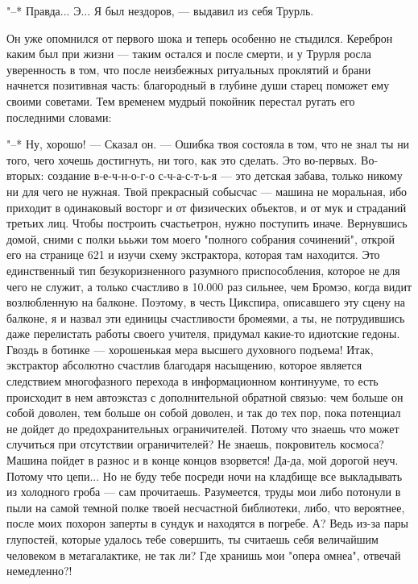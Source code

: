 "--* Правда... Э... Я был нездоров, --- выдавил из себя
Трурль.

Он уже опомнился от первого шока и теперь особенно не
стыдился. Кереброн каким был при жизни --- таким остался и
после смерти, и у Трурля росла уверенность в том, что после
неизбежных ритуальных проклятий и брани начнется позитивная
часть: благородный в глубине души старец поможет ему своими
советами. Тем временем мудрый покойник перестал ругать его
последними словами:

"--* Ну, хорошо! --- Сказал он. --- Ошибка твоя состояла в
том, что не знал ты ни того, чего хочешь достигнуть, ни
того, как это сделать. Это во-первых. Во-вторых: создание
в-е-ч-н-о-г-о с-ч-а-с-т-ь-я --- это детская забава, только
никому ни для чего не нужная. Твой прекрасный собысчас --- машина
не моральная, ибо приходит в одинаковый восторг и от
физических объектов, и от мук и страданий третьих лиц. Чтобы
построить счастьетрон, нужно поступить иначе. Вернувшись
домой, сними с полки ьььжи том моего "полного собрания
сочинений", открой его на странице 621 и изучи схему
экстрактора, которая там находится. Это единственный тип
безукоризненного разумного приспособления, которое не для
чего не служит, а только счастливо в 10.000 раз сильнее, чем
Бромэо, когда видит возлюбленную на балконе. Поэтому, в
честь Цикспира, описавшего эту сцену на балконе, я и назвал
эти единицы счастливости бромеями, а ты, не потрудившись
даже перелистать работы своего учителя, придумал какие-то
идиотские гедоны. Гвоздь в ботинке --- хорошенькая мера
высшего духовного подъема! Итак, экстрактор абсолютно
счастлив благодаря насыщению, которое является следствием
многофазного перехода в информационном континууме, то есть
происходит в нем автоэкстаз с дополнительной обратной
связью: чем больше он собой доволен, тем больше он собой
доволен, и так до тех пор, пока потенциал не дойдет до
предохранительных ограничителей. Потому что знаешь что может
случиться при отсутствии ограничителей? Не знаешь,
покровитель космоса? Машина пойдет в разнос и в конце концов
взорвется! Да-да, мой дорогой неуч. Потому что цепи... Но не
буду тебе посреди ночи на кладбище все выкладывать из
холодного гроба --- сам прочитаешь. Разумеется, труды мои либо
потонули в пыли на самой темной полке твоей несчастной
библиотеки, либо, что вероятнее, после моих похорон заперты
в сундук и находятся в погребе. А? Ведь из-за пары
глупостей, которые удалось тебе совершить, ты считаешь себя
величайшим человеком в метагалактике, не так ли? Где хранишь
мои "опера омнеа", отвечай немедленно?!

